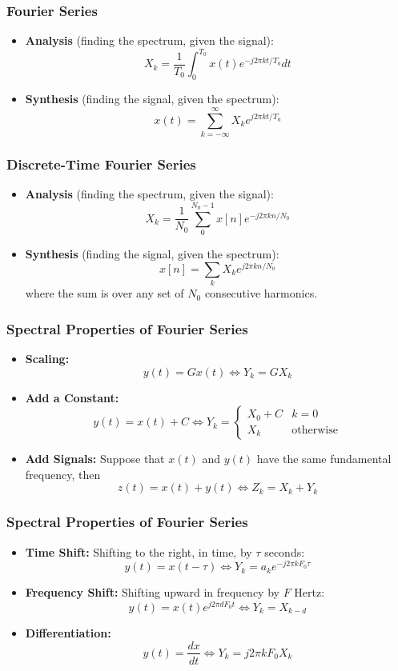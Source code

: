 \documentclass{beamer}
\begin{document}
\begin{frame}
  \frametitle{Fourier Series}

  \begin{itemize}
  \item {\bf Analysis}  (finding the spectrum, given the signal):
    \[
    X_k = \frac{1}{T_0}\int_0^{T_0} x(t)e^{-j2\pi kt/T_0}dt
    \]
  \item {\bf Synthesis} (finding the signal, given the spectrum):
    \[
    x(t) = \sum_{k=-\infty}^\infty X_k e^{j2\pi kt/T_0}
    \]
  \end{itemize}
\end{frame}  

\begin{frame}
  \frametitle{Discrete-Time Fourier Series}

  \begin{itemize}
  \item {\bf Analysis}  (finding the spectrum, given the signal):
    \[
    X_k = \frac{1}{N_0}\sum_0^{N_0-1} x[n]e^{-j2\pi kn/N_0}
    \]
  \item {\bf Synthesis} (finding the signal, given the spectrum):
    \[
    x[n] = \sum_k X_k e^{j2\pi kn/N_0}
    \]
    where the sum is over any set of $N_0$ consecutive harmonics.
  \end{itemize}
\end{frame}  

\begin{frame}
  \frametitle{Spectral Properties of Fourier Series}
  \begin{itemize}
  \item {\bf Scaling:}
    \[
    y(t) = Gx(t)\Leftrightarrow Y_k = GX_k
    \]
  \item {\bf Add a Constant:}
    \[
    y(t)=x(t)+C \Leftrightarrow
    Y_k = \begin{cases}
      X_0+C & k=0 \\
      X_k & \mbox{otherwise}
    \end{cases}
    \]
  \item {\bf Add Signals:} Suppose that $x(t)$ and $y(t)$ have the
    same fundamental frequency, then
    \[
    z(t)=x(t)+y(t)
    \Leftrightarrow
    Z_k = X_k+Y_k
    \]
  \end{itemize}
\end{frame}  

\begin{frame}
  \frametitle{Spectral Properties of Fourier Series}
  \begin{itemize}
  \item {\bf Time Shift:} Shifting to the right, in time, by $\tau$
    seconds:
    \[
    y(t)=x(t-\tau)\Leftrightarrow Y_k= a_k e^{-j2\pi kF_0\tau}
    \]
  \item {\bf Frequency Shift:} Shifting upward in frequency by $F$
    Hertz:
    \[
    y(t)=x(t)e^{j2\pi dF_0t} \Leftrightarrow Y_k= X_{k-d}
    \]
  \item {\bf Differentiation:}
    \[
    y(t) = \frac{dx}{dt} \Leftrightarrow Y_k= j2\pi kF_0 X_k
    \]
  \end{itemize}
\end{frame}  
\end{document}
